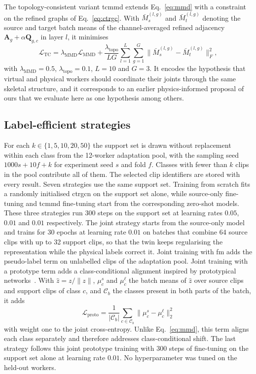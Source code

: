 \documentclass[3p,times,procedia]{elsarticle}
\begin{document}
The topology-consistent variant \ac{tcmmd} extends Eq.~\ref{eq:mmd} with a
constraint on the refined graphs of Eq.~\ref{eq:ctrgc}. With
$\bar{M}^{(l,g)}_s$ and $\bar{M}^{(l,g)}_t$ denoting the source and target
batch means of the channel-averaged refined adjacency
$\mathbf{A}_g+\alpha\mathbf{Q}_{g,c}$ in layer $l$, it minimises
\begin{equation}
  \mathcal{L}_{\mathrm{TC}}=\lambda_{\mathrm{MMD}}\mathcal{L}_{\mathrm{MMD}}
  +\frac{\lambda_{\mathrm{topo}}}{LG}\sum_{l=1}^{L}\sum_{g=1}^{G}
  \bigl\|\bar{M}^{(l,g)}_s-\bar{M}^{(l,g)}_t\bigr\|_F^2,
  \label{eq:tc}
\end{equation}
with $\lambda_{\mathrm{MMD}}=0.5$, $\lambda_{\mathrm{topo}}=0.1$, $L=10$ and
$G=3$. It encodes the hypothesis that virtual and physical workers should
coordinate their joints through the same skeletal structure, and it corresponds
to an earlier physics-informed proposal of ours that we evaluate here as one
hypothesis among others.

\subsection{Label-efficient strategies}

For each $k\in\{1,5,10,20,50\}$ the support set is drawn without replacement
within each class from the 12-worker adaptation pool, with the sampling seed
$1000s+10f+k$ for experiment seed $s$ and fold $f$. Classes with fewer than $k$
clips in the pool contribute all of them. The selected clip identifiers are
stored with every result. Seven strategies use the same support set. Training
from scratch fits a randomly initialised \ac{ctrgcn} on the support set alone,
while source-only fine-tuning and \ac{tcmmd} fine-tuning start from the
corresponding zero-shot models. These three strategies run 300 steps on the
support set at learning rates $0.05$, $0.01$ and $0.01$ respectively. The
joint strategy starts from the source-only model and trains for 30 epochs at
learning rate $0.01$ on batches that combine 64 source clips with up to 32
support clips, so that the twin keeps regularising the representation while
the physical labels correct it. Joint training with \ac{fm} adds the
pseudo-label term on unlabelled clips of the adaptation pool. Joint training
with a prototype term adds a class-conditional alignment inspired by
prototypical networks~\cite{snell2017prototypical}. With $\hat{z}=z/\|z\|$,
$\mu_c^s$ and $\mu_c^\ell$ the batch means of $\hat{z}$ over source clips and
support clips of class $c$, and $\mathcal{C}_b$ the classes present in both
parts of the batch, it adds
\begin{equation}
  \mathcal{L}_{\mathrm{proto}}=\frac{1}{|\mathcal{C}_b|}\sum_{c\in\mathcal{C}_b}
  \bigl\|\mu_c^s-\mu_c^\ell\bigr\|_2^2
  \label{eq:proto}
\end{equation}
with weight one to the joint cross-entropy. Unlike Eq.~\ref{eq:mmd}, this term
aligns each class separately and therefore addresses class-conditional shift.
The last strategy follows this joint prototype training with 300 steps of
fine-tuning on the support set alone at learning rate $0.01$. No
hyperparameter was tuned on the held-out workers.
\end{document}
